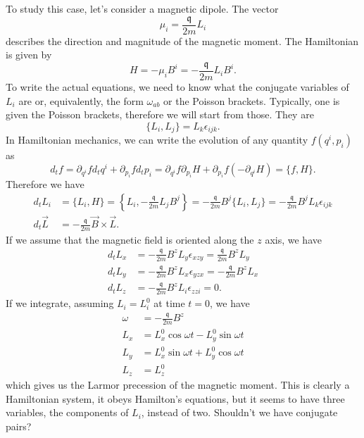 To study this case, let's consider a magnetic dipole. The vector
\begin{equation}
	\mu_i = \frac{\mathfrak{q}}{2m} L_i
\end{equation}
describes the direction and magnitude of the magnetic moment. The Hamiltonian is given by
\begin{equation}
	H = - \mu_i B^i = - \frac{\mathfrak{q}}{2m} L_i B^i.
\end{equation}
To write the actual equations, we need to know what the conjugate variables of $L_i$ are or, equivalently, the form $\omega_{ab}$ or the Poisson brackets. Typically, one is given the Poisson brackets, therefore we will start from those. They are
\begin{equation}
	\{L_i, L_j\} = L_k \epsilon_{ijk}.
\end{equation}
In Hamiltonian mechanics, we can write the evolution of any quantity $f(q^i, p_i)$ as
\begin{equation}
	d_t f = \partial_{q^i} f d_t q^i + \partial_{p_i} f d_t p_i = \partial_{q^i} f \partial_{p_i} H + \partial_{p_i} f (-\partial_{q^i} H) = \{f, H\}.
\end{equation}
Therefore we have
\begin{equation}
	\begin{aligned}
	d_t L_i &= \{L_i, H\} = \left\{ L_i, - \frac{\mathfrak{q}}{2m} L_j B^j \right\}  = - \frac{\mathfrak{q}}{2m} B^j\{L_i, L_j\} = - \frac{\mathfrak{q}}{2m} B^j L_k \epsilon_{ijk}\\
	d_t \vec{L} &= - \frac{\mathfrak{q}}{2m} \vec{B} \times \vec{L} .
	\end{aligned}
\end{equation}
If we assume that the magnetic field is oriented along the $z$ axis, we have
\begin{equation}
	\begin{aligned}
		d_t L_x &= - \frac{\mathfrak{q}}{2m} B^z L_y \epsilon_{xzy} = \frac{\mathfrak{q}}{2m} B^z L_y \\
		d_t L_y &= - \frac{\mathfrak{q}}{2m} B^z L_x \epsilon_{yzx} = - \frac{\mathfrak{q}}{2m} B^z L_x \\
		d_t L_z &= - \frac{\mathfrak{q}}{2m} B^z L_i \epsilon_{zzi} = 0.
	\end{aligned}
\end{equation}
If we integrate, assuming $L_i = L^0_i$ at time $t=0$, we have
\begin{equation}
	\begin{aligned}
		\omega &= - \frac{\mathfrak{q}}{2m} B^z \\
		L_x & = L_x^0 \cos \omega t - L_y^0 \sin \omega t \\
		L_y & = L_x^0 \sin \omega t + L_y^0 \cos \omega t \\
		L_z &= L_z^0
	\end{aligned}
\end{equation}
which gives us the Larmor precession of the magnetic moment. This is clearly a Hamiltonian system, it obeys Hamilton's equations, but it seems to have three variables, the components of $L_i$, instead of two. Shouldn't we have conjugate pairs?


